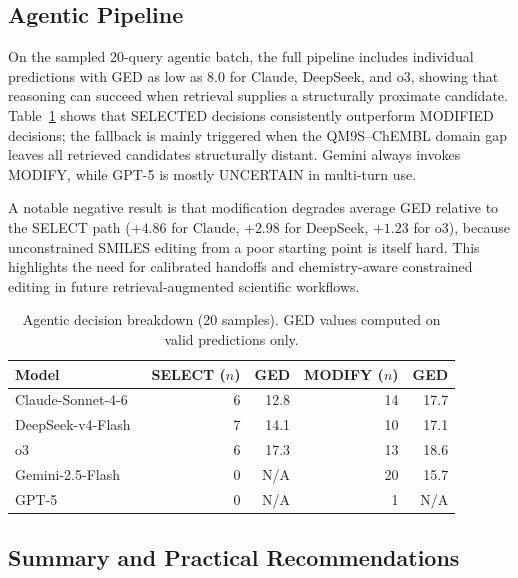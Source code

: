 \documentclass[conference]{IEEEtran}
\begin{document}
\subsection{Agentic Pipeline}

On the sampled 20-query agentic batch, the full pipeline includes individual predictions with GED as low as 8.0 for Claude, DeepSeek, and o3, showing that reasoning can succeed when retrieval supplies a structurally proximate candidate. Table~\ref{tab:agentic_decisions} shows that SELECTED decisions consistently outperform MODIFIED decisions; the fallback is mainly triggered when the QM9S--ChEMBL domain gap leaves all retrieved candidates structurally distant. Gemini always invokes MODIFY, while GPT-5 is mostly UNCERTAIN in multi-turn use.

A notable negative result is that modification degrades average GED relative to the SELECT path ($+4.86$ for Claude, $+2.98$ for DeepSeek, $+1.23$ for o3), because unconstrained SMILES editing from a poor starting point is itself hard. This highlights the need for calibrated handoffs and chemistry-aware constrained editing in future retrieval-augmented scientific workflows.

\begin{table}[t]
\centering
\scriptsize
\caption{Agentic decision breakdown (20 samples). GED values computed on valid predictions only.}
\label{tab:agentic_decisions}
\begin{tabular}{lrrrr}
\toprule
Model & SELECT ($n$) & GED & MODIFY ($n$) & GED\\
\midrule
Claude-Sonnet-4-6~\cite{claude-sonnet-4-6} & 6 & 12.8 & 14 & 17.7\\
DeepSeek-v4-Flash~\cite{deepseek2026deepseek} & 7 & 14.1 & 10 & 17.1\\
o3~\cite{o3_and_o4-mini} & 6 & 17.3 & 13 & 18.6\\
Gemini-2.5-Flash~\cite{gemini2-5} & 0 & N/A & 20 & 15.7\\
GPT-5~\cite{gpt-5} & 0 & N/A & 1 & N/A\\
\bottomrule
\end{tabular}
\end{table}

\subsection{Summary and Practical Recommendations}
\end{document}
